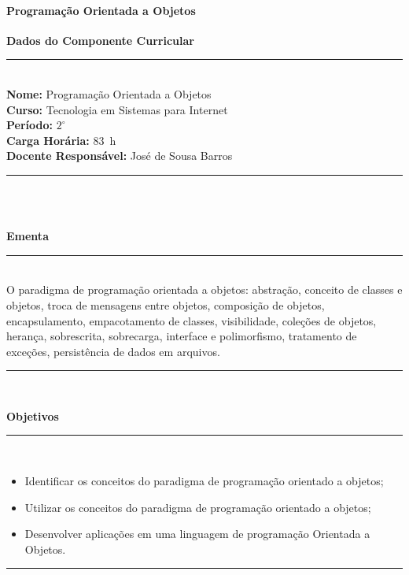 \paragraph{Programação Orientada a Objetos}

\begin{center}\textbf{Dados do Componente Curricular}\end{center}

\noindent\rule{16.2cm}{0.4pt}
\\
\textbf{Nome:} Programação Orientada a Objetos
\\
\textbf{Curso:} Tecnologia em Sistemas para Internet
\\ 
\textbf{Período:} $2^{\circ}$ 
\\
\textbf{Carga Horária:} 83~h 
\\ 
\textbf{Docente Responsável:} José de Sousa Barros 
\\ 
\noindent\rule{16.2cm}{0.4pt}\\
\\


\begin{center}\textbf{Ementa}\end{center}
\noindent\rule{16.2cm}{0.4pt}
\\
O paradigma de programação orientada a objetos: abstração, conceito de classes e objetos, troca de mensagens entre objetos, composição de objetos, encapsulamento, empacotamento de classes, visibilidade, coleções de objetos, herança, sobrescrita, sobrecarga, interface e polimorfismo, tratamento de exceções, persistência de dados em arquivos. \\
\noindent\rule{16.2cm}{0.4pt}\\

\begin{center}\textbf{Objetivos}\end{center}
\noindent\rule{16.2cm}{0.4pt}
\\
\begin{itemize}
\item Identificar os conceitos do paradigma de programação orientado a objetos;
\item Utilizar os conceitos do paradigma de programação orientado a objetos;
\item Desenvolver aplicações em uma linguagem de programação Orientada a Objetos.
\end{itemize}
\noindent\rule{16.2cm}{0.4pt}\\
\\

